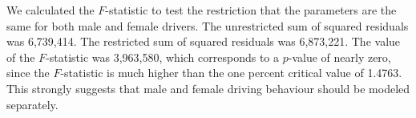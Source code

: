 



We calculated the $F$-statistic to test the restriction 
that the parameters are the same for both male and female drivers. 
The unrestricted sum of squared residuals was 6,739,414. 
The restricted sum of squared residuals was 6,873,221. 
The value of the $F$-statistic was 3,963,580, 
which corresponds to a $p$-value of nearly zero, since the $F$-statistic is much higher than 
 the one percent critical value of 1.4763. 
This strongly suggests that male and female driving behaviour should be modeled separately. 
